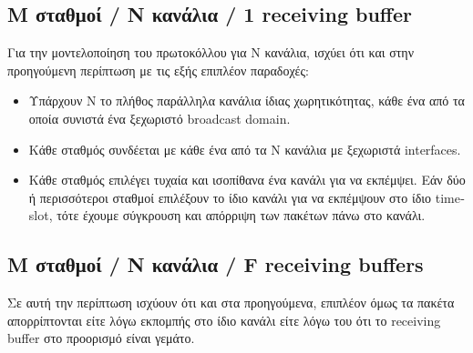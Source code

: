 \documentclass[12pt]{report}
\begin{document}
\subsection{\textlatin{M} σταθμοί / N κανάλια / 1 \textlatin{receiving buffer}}
Για την μοντελοποίηση του πρωτοκόλλου για \textlatin{N} κανάλια, ισχύει ότι και στην προηγούμενη περίπτωση με τις εξής επιπλέον παραδοχές:
\begin{itemize}
	\item Υπάρχουν \textlatin{N} το πλήθος παράλληλα κανάλια ίδιας χωρητικότητας, κάθε ένα από τα οποία συνιστά ένα ξεχωριστό \textlatin{broadcast domain}.
	\item Κάθε σταθμός συνδέεται με κάθε ένα από τα \textlatin{N} κανάλια με ξεχωριστά \textlatin{interfaces}.
	\item Κάθε σταθμός επιλέγει τυχαία και ισοπίθανα ένα κανάλι για να εκπέμψει. Εάν δύο ή περισσότεροι σταθμοί επιλέξουν το ίδιο κανάλι για να εκπέμψουν στο ίδιο \textlatin{timeslot}, τότε έχουμε σύγκρουση και απόρριψη των πακέτων πάνω στο κανάλι.
\end{itemize}

\subsection{\textlatin{M} σταθμοί / \textlatin{N} κανάλια / \textlatin{F} \textlatin{receiving buffers}}
Σε αυτή την περίπτωση ισχύουν ότι και στα προηγούμενα, επιπλέον όμως τα πακέτα απορρίπτονται είτε λόγω εκπομπής στο ίδιο κανάλι είτε λόγω του ότι το \textlatin{receiving buffer} στο προορισμό είναι γεμάτο.
\end{document}
